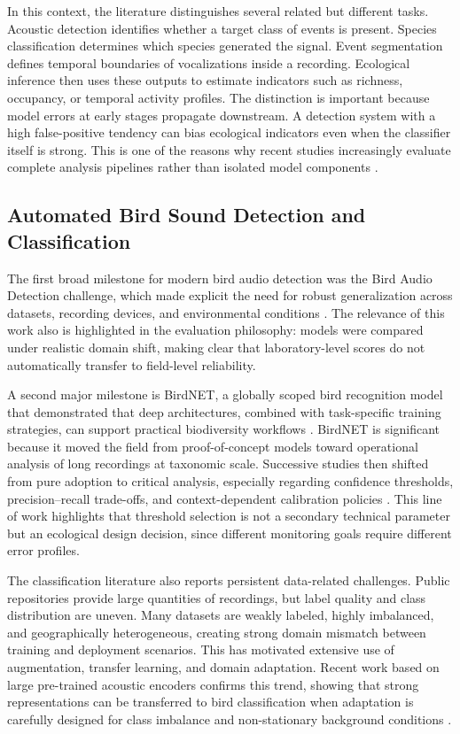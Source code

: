 \documentclass[a4paper,singleside,12pt]{report} %
\begin{document}
	In this context, the literature distinguishes several related but different tasks. Acoustic detection identifies whether a target class of events is present. Species classification determines which species generated the signal. Event segmentation defines temporal boundaries of vocalizations inside a recording. Ecological inference then uses these outputs to estimate indicators such as richness, occupancy, or temporal activity profiles. The distinction is important because model errors at early stages propagate downstream. A detection system with a high false-positive tendency can bias ecological indicators even when the classifier itself is strong. This is one of the reasons why recent studies increasingly evaluate complete analysis pipelines rather than isolated model components \cite{nietomora2023systematic,perezgranados2023birdnet}.

	\subsection{Automated Bird Sound Detection and Classification}
	The first broad milestone for modern bird audio detection was the Bird Audio Detection challenge, which made explicit the need for robust generalization across datasets, recording devices, and environmental conditions \cite{stowell2019birdaudiodetection}. The relevance of this work also is highlighted in the evaluation philosophy: models were compared under realistic domain shift, making clear that laboratory-level scores do not automatically transfer to field-level reliability.

	A second major milestone is BirdNET, a globally scoped bird recognition model that demonstrated that deep architectures, combined with task-specific training strategies, can support practical biodiversity workflows \cite{birdnet2021}. BirdNET is significant because it moved the field from proof-of-concept models toward operational analysis of long recordings at taxonomic scale. Successive studies then shifted from pure adoption to critical analysis, especially regarding confidence thresholds, precision--recall trade-offs, and context-dependent calibration policies \cite{perezgranados2023birdnet}. This line of work highlights that threshold selection is not a secondary technical parameter but an ecological design decision, since different monitoring goals require different error profiles.

	The classification literature also reports persistent data-related challenges. Public repositories provide large quantities of recordings, but label quality and class distribution are uneven. Many datasets are weakly labeled, highly imbalanced, and geographically heterogeneous, creating strong domain mismatch between training and deployment scenarios. This has motivated extensive use of augmentation, transfer learning, and domain adaptation. Recent work based on large pre-trained acoustic encoders confirms this trend, showing that strong representations can be transferred to bird classification when adaptation is carefully designed for class imbalance and non-stationary background conditions \cite{sheikh2024birdwhisperer}.
\end{document}
